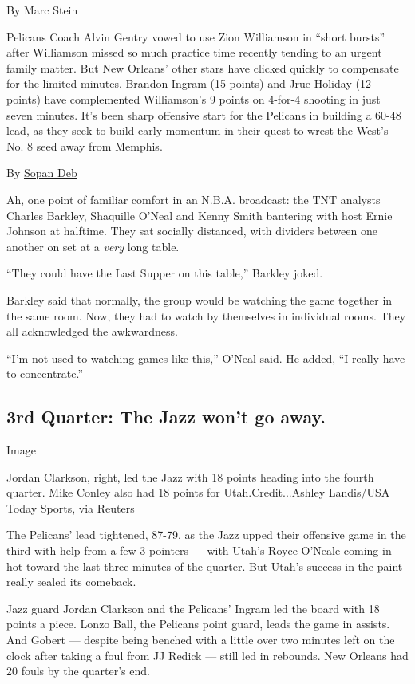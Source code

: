 By Marc Stein

Pelicans Coach Alvin Gentry vowed to use Zion Williamson in ``short
bursts'' after Williamson missed so much practice time recently tending
to an urgent family matter. But New Orleans' other stars have clicked
quickly to compensate for the limited minutes. Brandon Ingram (15
points) and Jrue Holiday (12 points) have complemented Williamson's 9
points on 4-for-4 shooting in just seven minutes. It's been sharp
offensive start for the Pelicans in building a 60-48 lead, as they seek
to build early momentum in their quest to wrest the West's No. 8 seed
away from Memphis.

By \href{https://www.nytimes.com/by/sopan-deb}{Sopan Deb}

Ah, one point of familiar comfort in an N.B.A. broadcast: the TNT
analysts Charles Barkley, Shaquille O'Neal and Kenny Smith bantering
with host Ernie Johnson at halftime. They sat socially distanced, with
dividers between one another on set at a \emph{very} long table.

``They could have the Last Supper on this table,'' Barkley joked.

Barkley said that normally, the group would be watching the game
together in the same room. Now, they had to watch by themselves in
individual rooms. They all acknowledged the awkwardness.

``I'm not used to watching games like this,'' O'Neal said. He added, ``I
really have to concentrate.''

\hypertarget{3rd-quarter-the-jazz-wont-go-away}{%
\subsection{3rd Quarter: The Jazz won't go
away.}\label{3rd-quarter-the-jazz-wont-go-away}}

Image

Jordan Clarkson, right, led the Jazz with 18 points heading into the
fourth quarter. Mike Conley also had 18 points for Utah.Credit...Ashley
Landis/USA Today Sports, via Reuters

The Pelicans' lead tightened, 87-79, as the Jazz upped their offensive
game in the third with help from a few 3-pointers --- with Utah's Royce
O'Neale coming in hot toward the last three minutes of the quarter. But
Utah's success in the paint really sealed its comeback.

Jazz guard Jordan Clarkson and the Pelicans' Ingram led the board with
18 points a piece. Lonzo Ball, the Pelicans point guard, leads the game
in assists. And Gobert --- despite being benched with a little over two
minutes left on the clock after taking a foul from JJ Redick --- still
led in rebounds. New Orleans had 20 fouls by the quarter's end.


